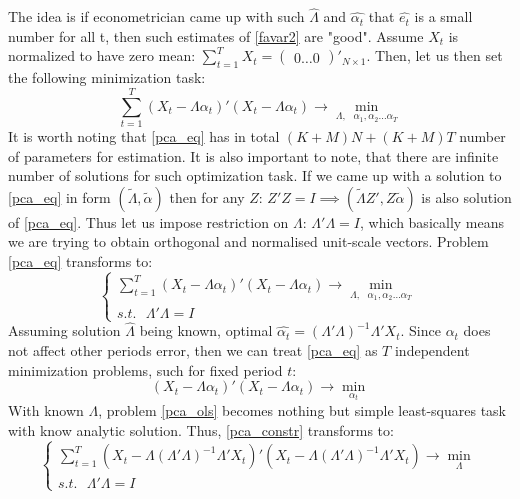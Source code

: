 \documentclass[a4paper, 14pt]{article}
\begin{document}
The idea is if econometrician came up with such $\hat{\Lambda}$ and $\hat{\alpha_t}$ that $\hat{e_t}$ is a small number for all t, then such estimates of \eqref{favar2} are "good". Assume $X_t$ is normalized to have zero mean: $\sum_{t=1}^{T} X_t = \begin{pmatrix} 
0 \dots 0
\end{pmatrix}'_{N \times 1}$. \noindent Then, let us then set the following minimization task: 
\begin{equation}\label{pca_eq}
\sum_{t=1}^{T} (X_t - \Lambda \alpha_t)'(X_t - \Lambda \alpha_t) \rightarrow \min_{\Lambda,\text{ } \alpha_1, \alpha_2 \dotsc \alpha_T} 
\end{equation}
It is worth noting that \eqref{pca_eq} has in total $(K+M)  N+ (K+M) T$ number of parameters for estimation. It is also important to note, that there are infinite number of solutions for such optimization task. If we came up with a solution to \eqref{pca_eq} in form $(\tilde{\Lambda}, \widetilde{\alpha})$ then for any $Z$: $Z'Z=I \implies (\tilde{\Lambda} Z',Z\widetilde{\alpha})$ is also solution of \eqref{pca_eq}. Thus let us impose restriction on $\Lambda$: $\Lambda'\Lambda = I$, which basically means we are trying to obtain orthogonal  and normalised unit-scale vectors. Problem \eqref{pca_eq} transforms to: 
\begin{equation}\label{pca_constr}
	\begin{cases}
		\sum_{t=1}^{T} (X_t - \Lambda \alpha_t)'(X_t - \Lambda \alpha_t) \rightarrow \min_{\Lambda,\text{ } \alpha_1, \alpha_2 \dotsc \alpha_T} \\
		s.t. \text{ } \Lambda'\Lambda = I
	\end{cases}
\end{equation}
Assuming solution $\hat{\Lambda}$ being known, optimal $\hat{\alpha_t} = (\Lambda' \Lambda)^{-1}\Lambda'X_t$. Since $\alpha_t$ does not affect other periods error, then we  can treat \eqref{pca_eq} as $T$ independent minimization problems, such for fixed period $t$: 
\begin{equation} \label{pca_ols}
(X_t - \Lambda \alpha_t)'(X_t - \Lambda \alpha_t) \rightarrow \min_{ \alpha_t}
\end{equation}
With known $\Lambda$, problem \eqref{pca_ols} becomes nothing but simple least-squares task with know analytic solution. Thus, \eqref{pca_constr} transforms to:
\begin{equation}
	\begin{cases}
	\sum_{t=1}^{T} (X_t - \Lambda (\Lambda' \Lambda)^{-1}\Lambda'X_t)'(X_t - \Lambda (\Lambda' \Lambda)^{-1}\Lambda'X_t) \rightarrow \min_{\Lambda} \\
	s.t. \text{ } \Lambda'\Lambda = I
	\end{cases}
\end{equation}
\end{document}
